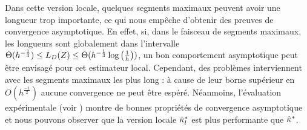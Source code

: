 %
Dans cette version locale, quelques segments maximaux peuvent avoir une longueur
trop importante, ce qui nous empêche d'obtenir des preuves de convergence
asymptotique. En effet, si, dans le faisceau de segments maximaux, les longueurs
sont globalement dans l'intervalle $\Theta(h^{-\frac{1}{3}}) \le L_D(
{Z} ) \le \Theta(h^{-\frac{1}{3}} \log \left(\frac{1}{h}\right))$, un
bon comportement asymptotique peut être envisagé pour cet estimateur local.
Cependant, des problèmes interviennent avec les segments maximaux les plus long : à
cause de leur borne supérieur en $O(h^\frac{-1}{2})$ aucune convergence ne peut
être espéré. Néanmoins, l'évaluation expérimentale (voir
) montre de bonnes propriétés de
convergence asymptotique et nous pouvons observer que la version locale
$\hat{\kappa}^{*}_{l}$ est plus performante que $\hat{\kappa}^{*}$.
%
